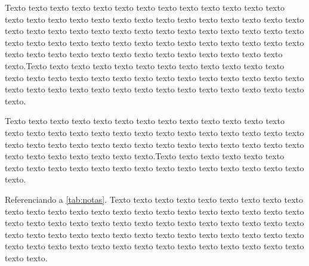 Texto texto texto texto texto texto texto texto texto texto texto texto texto texto texto texto texto texto texto texto texto texto texto texto texto texto texto texto texto texto texto texto texto texto texto texto texto texto texto texto texto texto texto texto texto texto texto texto texto texto texto texto texto texto texto texto texto texto texto texto texto texto texto texto texto texto texto texto texto.Texto texto texto texto texto texto texto texto texto texto texto texto texto texto texto texto texto texto texto texto texto texto texto texto texto texto texto texto texto texto texto texto texto texto texto texto texto texto texto texto texto.

Texto texto texto texto texto texto texto texto texto texto texto texto texto texto texto texto texto texto texto texto texto texto texto texto texto texto texto texto texto texto texto texto texto texto texto texto texto texto texto texto texto texto texto texto texto texto texto texto.Texto texto texto texto texto texto texto texto texto texto texto texto texto texto texto texto texto texto texto texto texto.

Referenciando a \autoref{tab:notas}. Texto texto texto texto texto texto texto texto texto texto texto texto texto texto texto texto texto texto texto texto texto texto texto texto texto texto texto texto texto texto texto texto texto texto texto texto texto texto texto texto texto texto texto texto texto texto texto texto texto texto texto texto texto texto texto texto texto texto texto texto texto texto texto texto texto texto texto.